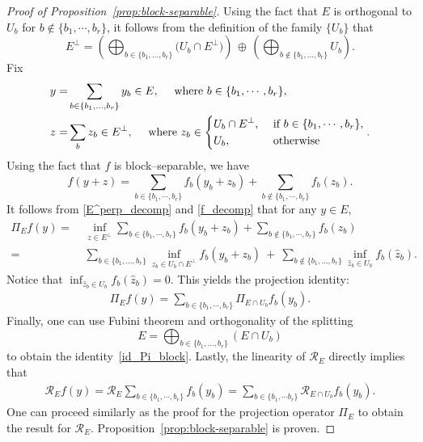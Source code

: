 \documentclass[11pt]{article}
\theoremstyle{definition}
\numberwithin{equation}{section}
\begin{document}
\begin{proof}[Proof of Proposition~\ref{prop:block-separable}]
Using the fact that $E$ is orthogonal to $U_b$ for $b \not\in \{b_1, \cdots, b_r\}$, it follows from the definition of the family $\{ U_b \}$ that
\begin{equation}\label{E^perp_decomp}
    E^\perp 
    =
    \left( \bigoplus_{b\in\{b_1,\dots,b_r\}} \big( U_b\cap E^\perp \big) \right)
    \,\oplus\,
    \left( \bigoplus_{b\notin\{b_1,\dots,b_r\}}U_b \right).
\end{equation}
Fix 
\begin{align*}
    y = & \sum_{b\in\{b_1,\dots,b_r\}}y_b\in E, \quad  \text{ where } b \in \{b_1, \cdots, b_r \}, \\
    z = & \sum_b z_b \in E^\perp, \quad \text{ where }
    z_b \in 
    \begin{dcases}
        U_b \cap E^\perp, & \text{ if } b \in \{b_1, \cdots, b_r \},\\
        U_b, & \text{ otherwise}
    \end{dcases}.
\end{align*}
Using the fact that $f$ is block--separable, we have
\begin{equation}\label{f_decomp}
f(y+z)=\sum_{b \in \{b_1, \cdots, b_r \}} f_b(y_b+z_b) + \sum_{b \not\in \{b_1, \cdots, b_r \}} f_b(z_b).
\end{equation}
It follows from \eqref{E^perp_decomp} and \eqref{f_decomp} that for any $y \in E$,
\begin{align*}
\Pi_E f(y)
= & ~ 
\inf_{z\in E^\perp}\sum_{b \in \{b_1, \cdots, b_r \}} f_b(y_b + z_b) + \sum_{b \not\in \{b_1, \cdots, b_r\}} f_b(z_b)  \\
= & ~ 
\sum_{b\in\{b_1,\dots,b_r\}}\inf_{z_b\in U_b\cap E^\perp} f_b(y_b+z_b)\ +\ \sum_{b\notin\{b_1,\dots,b_r\}} \inf_{\hat z_b\in U_b} f_b(\hat z_b).
\end{align*}
Notice that $\textstyle\inf_{\hat z_b \in U_b} f_b(\hat z_b) = 0$.
This yields the projection identity:
\begin{align*}
    \Pi_E f(y) = \sum_{b \in \{b_1, \cdots, b_r \}} \Pi_{E \cap U_b} f_b(y_b).
\end{align*}
Finally, one can use Fubini theorem and orthogonality of the splitting 
\[
E=\bigoplus_{b\in\{b_1,\dots,b_r\}} (E\cap U_b)
\]
to obtain the identity~\eqref{id_Pi_block}.
Lastly, the linearity of $\mathscr{R}_E$ directly implies that
\begin{align*}
    \mathscr R_E f(y) = \mathscr R_E \sum_{b \in \{b_1, \cdots, b_r \}} f_b(y_b) = \sum_{b \in \{b_1, \cdots b_r\} } \mathscr R_{E \cap U_b} f_b(y_b).
\end{align*}
One can proceed similarly as the proof for the projection operator $\Pi_E$ to obtain the result for $\mathscr R_E$.
Proposition~\ref{prop:block-separable} is proven.
\end{proof}
\end{document}
